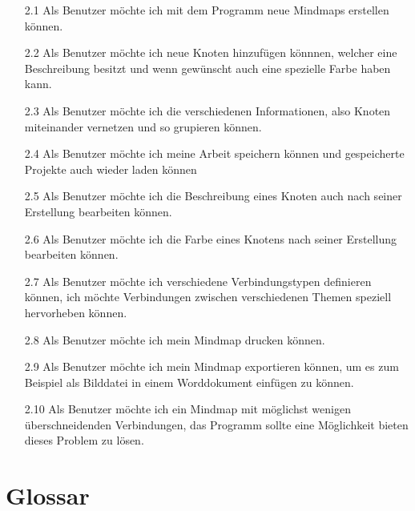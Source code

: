 \documentclass[a4paper,parskip]{scrartcl}
\begin{document}
\begin{enumerate}
\item [2.1] Als Benutzer möchte ich mit dem Programm neue Mindmaps erstellen können.
\item [2.2] Als Benutzer möchte ich neue Knoten hinzufügen könnnen, welcher eine Beschreibung besitzt und wenn gewünscht auch eine spezielle Farbe haben kann. 
\item [2.3] Als Benutzer möchte ich die verschiedenen Informationen, also Knoten miteinander vernetzen und so grupieren können. 
\item [2.4] Als Benutzer möchte ich meine Arbeit speichern können und gespeicherte Projekte auch wieder laden können
\item [2.5] Als Benutzer möchte ich die Beschreibung eines Knoten auch nach seiner Erstellung bearbeiten können.
\item [2.6] Als Benutzer möchte ich die Farbe eines Knotens nach seiner Erstellung bearbeiten können.
\item [2.7] Als Benutzer möchte ich verschiedene Verbindungstypen definieren können, ich möchte Verbindungen zwischen verschiedenen Themen speziell hervorheben können. 
\item [2.8] Als Benutzer möchte ich mein Mindmap drucken können.
\item [2.9] Als Benutzer möchte ich mein Mindmap exportieren können, um es zum Beispiel als Bilddatei in einem Worddokument einfügen zu können.
\item [2.10] Als Benutzer möchte ich ein Mindmap mit möglichst wenigen überschneidenden Verbindungen, das Programm sollte eine Möglichkeit bieten dieses Problem zu lösen.
\end{enumerate}

\section{Glossar}
\end{document}
